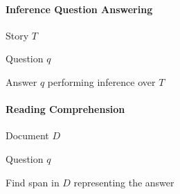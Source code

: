 \documentclass[10pt]{report}
\begin{document}
\begin{multicols}{2}
\paragraph{Inference Question Answering}
\begin{list}{}{}
	\item Story $T$
	\item Question $q$
	\item Answer $q$ performing inference over $T$
\end{list}
\paragraph{Reading Comprehension}
\begin{list}{}{}
	\item Document $D$
	\item Question $q$
	\item Find span in $D$ representing the answer
\end{list}
\end{multicols}
\end{document}

